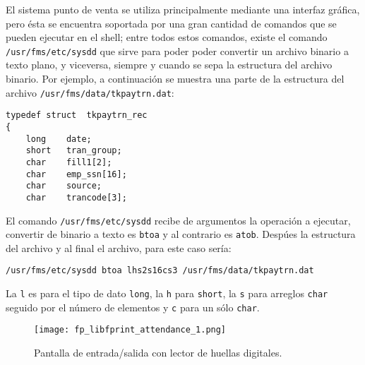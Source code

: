 El sistema punto de venta se utiliza principalmente mediante una interfaz gráfica, pero ésta se encuentra soportada por una gran cantidad de comandos que se pueden ejecutar en el shell; entre todos estos comandos, existe el comando \texttt{/usr/fms/etc/sysdd} que sirve para poder poder convertir un archivo binario a texto plano, y viceversa, siempre y cuando se sepa la estructura del archivo binario. Por ejemplo, a continuación se muestra una parte de la estructura del archivo \texttt{/usr/fms/data/tkpaytrn.dat}:

\begin{Verbatim}
typedef struct  tkpaytrn_rec
{
    long    date;
    short   tran_group;
    char    fill1[2];
    char    emp_ssn[16];
    char    source;
    char    trancode[3];
\end{Verbatim}

El comando \texttt{/usr/fms/etc/sysdd} recibe de argumentos la operación a ejecutar, convertir de binario a texto es \texttt{btoa} y al contrario es \texttt{atob}. Despúes la estructura del archivo y al final el archivo, para este caso sería: 

\texttt{/usr/fms/etc/sysdd btoa lhs2s16cs3 /usr/fms/data/tkpaytrn.dat}

La \texttt{l} es para el tipo de dato \texttt{long}, la \texttt{h} para \texttt{short}, la \texttt{s} para arreglos \texttt{char} seguido por el número de elementos y \texttt{c} para un sólo \texttt{char}.

\begin{figure}[htb]
 \begin{center}
  \texttt{[image: fp\_libfprint\_attendance\_1.png]}
 \end{center}
 \caption{Pantalla de entrada/salida con lector de huellas digitales.}
 \label{fig:finger_print_5}
\end{figure}


